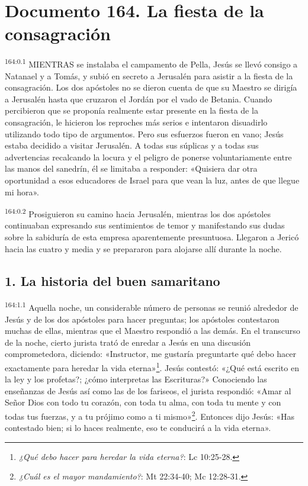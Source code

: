 \chapter{Documento 164. La fiesta de la consagración}
\par
\textsuperscript{164:0.1} MIENTRAS se instalaba el campamento de Pella, Jesús se llevó consigo a Natanael y a Tomás, y subió en secreto a Jerusalén para asistir a la fiesta de la consagración. Los dos apóstoles no se dieron cuenta de que su Maestro se dirigía a Jerusalén hasta que cruzaron el Jordán por el vado de Betania. Cuando percibieron que se proponía realmente estar presente en la fiesta de la consagración, le hicieron los reproches más serios e intentaron disuadirlo utilizando todo tipo de argumentos. Pero sus esfuerzos fueron en vano; Jesús estaba decidido a visitar Jerusalén. A todas sus súplicas y a todas sus advertencias recalcando la locura y el peligro de ponerse voluntariamente entre las manos del sanedrín, él se limitaba a responder: «Quisiera dar otra oportunidad a esos educadores de Israel para que vean la luz, antes de que llegue mi hora».

\par
\textsuperscript{164:0.2} Prosiguieron su camino hacia Jerusalén, mientras los dos apóstoles continuaban expresando sus sentimientos de temor y manifestando sus dudas sobre la sabiduría de esta empresa aparentemente presuntuosa. Llegaron a Jericó hacia las cuatro y media y se prepararon para alojarse allí durante la noche.

\section*{1. La historia del buen samaritano}
\par
\textsuperscript{164:1.1} Aquella noche, un considerable número de personas se reunió alrededor de Jesús y de los dos apóstoles para hacer preguntas; los apóstoles contestaron muchas de ellas, mientras que el Maestro respondió a las demás. En el transcurso de la noche, cierto jurista trató de enredar a Jesús en una discusión comprometedora, diciendo: «Instructor, me gustaría preguntarte qué debo hacer exactamente para heredar la vida eterna»\footnote{\textit{¿Qué debo hacer para heredar la vida eterna?}: Lc 10:25-28.}. Jesús contestó: «¿Qué está escrito en la ley y los profetas?; ¿cómo interpretas las Escrituras?» Conociendo las enseñanzas de Jesús así como las de los fariseos, el jurista respondió: «Amar al Señor Dios con todo tu corazón, con toda tu alma, con toda tu mente y con todas tus fuerzas, y a tu prójimo como a ti mismo»\footnote{\textit{¿Cuál es el mayor mandamiento?}: Mt 22:34-40; Mc 12:28-31.}. Entonces dijo Jesús: «Has contestado bien; si lo haces realmente, eso te conducirá a la vida eterna».

